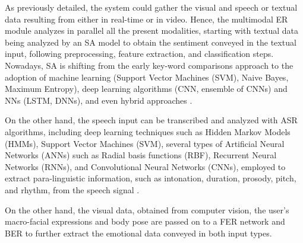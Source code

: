 \documentclass[runningheads]{llncs}
\begin{document}

As previously detailed, the system could gather the visual and speech or textual data resulting from either in real-time or in video. Hence, the multimodal ER module analyzes in parallel all the present modalities, starting with textual data being analyzed by an SA model to obtain the sentiment conveyed in the textual input, following preprocessing, feature extraction, and classification steps. Nowadays, SA is shifting from the early key-word comparisons approach to the adoption of machine learning (Support Vector Machines (SVM), Naive Bayes, Maximum Entropy), deep learning algorithms (CNN, ensemble of CNNs) and NNs (LSTM, DNNs), and even hybrid approaches \cite{hung_beyond_2023}.

On the other hand, the speech input can be transcribed and analyzed with ASR algorithms, including deep learning techniques such as Hidden Markov Models (HMMs), Support Vector Machines (SVM), several types of Artificial Neural Networks (ANNs) such as Radial basis functions (RBF), Recurrent Neural Networks (RNNs), and Convolutional Neural Networks (CNNs), employed to extract para-linguistic information, such as intonation, duration, prosody, pitch, and rhythm, from the speech signal \cite{malik_automatic_2021}.

On the other hand, the visual data, obtained from computer vision, the user's macro-facial expressions and body pose are passed on to a FER network and BER to further extract the emotional data conveyed in both input types.
\end{document}
